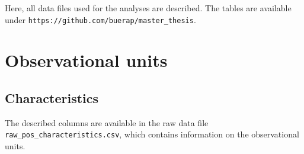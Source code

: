 \documentclass[
]{book}
\begin{document}
Here, all data files used for the analyses are described. The tables are available under \texttt{https://github.com/buerap/master\_thesis}.

\hypertarget{observational-units}{%
\section{Observational units}\label{observational-units}}

\hypertarget{characteristics}{%
\subsection{Characteristics}\label{characteristics}}

The described columns are available in the raw data file \texttt{raw\_pos\_characteristics.csv}, which contains information on the observational units.
\end{document}

